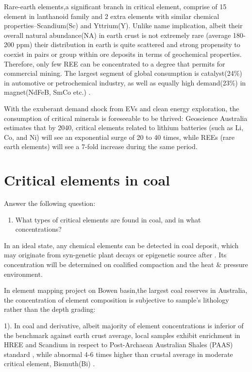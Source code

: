 \documentclass[preprint, 3p,
authoryear]{elsarticle} %
\providecommand{\tightlist}{%
  \setlength{\itemsep}{0pt}\setlength{\parskip}{0pt}}
\begin{document}
Rare-earth elements,a significant branch in critical element, comprise
of 15 element in lanthanoid family and 2 extra elements with similar
chemical properties--Scandium(Sc) and Yttrium(Y). Unlike name
implication, albeit their overall natural abundance(NA) in earth crust
is not extremely rare (average 180-200 ppm) their distribution in earth
is quite scattered and strong propensity to coexist in pairs or group
within ore deposits in terms of geochemical properties. Therefore, only
few REE can be concentrated to a degree that permits for commercial
mining. The largest segment of global consumption is catalyst(24\%) in
automotive or petrochemical industry, as well as equally high
demand(23\%) in magnet(NdFeB, SmCo etc.) \citet{Zhou2017}.

With the exuberant demand shock from EVs and clean energy exploration,
the consumption of critical minerals is foreseeable to be thrived:
Geoscience Australia estimates that by 2040, critical elements related
to lithium batteries (such as Li, Co, and Ni) will see an exponential
surge of 20 to 40 times, while REEs (rare earth elements) will see a
7-fold increase during the same period.

\hypertarget{critical-elements-in-coal}{%
\section{Critical elements in coal}\label{critical-elements-in-coal}}

Answer the following question:

\begin{enumerate}
\def\labelenumi{\arabic{enumi}.}
\setcounter{enumi}{1}
\tightlist
\item
  What types of critical elements are found in coal, and in what
  concentrations?
\end{enumerate}

In an ideal state, any chemical elements can be detected in coal
deposit, which may originate from syn-genetic plant decays or epigenetic
source after . Its concentration will be determined on coalified
compaction and the heat \& pressure environment.

In \citet{Hodgkinson2020} element mapping project on Bowen basin,the
largest coal reserves in Australia, the concentration of element
composition is subjective to sample's lithology rather than the depth
grading:

1). In coal and derivative, albeit majority of element concentrations is
inferior of the benchmark against earth crust average, local samples
exhibit enrichment in HREE and Scandium in respect to
\citet{McLennan2011} Post-Archaean Australian Shales (PAAS) standard ,
while abnormal 4-6 times higher than crustal average in moderate
critical element, Bismuth(Bi) .
\end{document}
